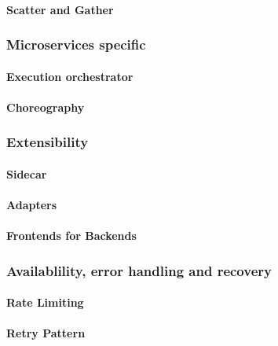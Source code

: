 \documentclass[a4paper, 11pt]{book}
\begin{document}
    \paragraph{Scatter and Gather}

    \subsubsection{Microservices specific}

    \paragraph{Execution orchestrator}

    \paragraph{Choreography}

    \subsubsection{Extensibility}

    \paragraph{Sidecar}

    \paragraph{Adapters}

    \paragraph{Frontends for Backends}

    \subsubsection{Availablility, error handling and recovery}

    \paragraph{Rate Limiting}

    \paragraph{Retry Pattern}
\end{document}
